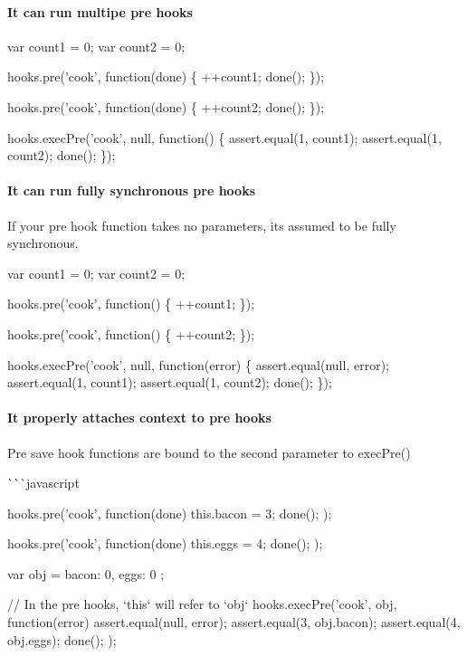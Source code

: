 \paragraph*{It can run multipe pre hooks}


\begin{DoxyCode}
var count1 = 0;
var count2 = 0;

hooks.pre('cook', function(done) \{
  ++count1;
  done();
\});

hooks.pre('cook', function(done) \{
  ++count2;
  done();
\});

hooks.execPre('cook', null, function() \{
  assert.equal(1, count1);
  assert.equal(1, count2);
  done();
\});
\end{DoxyCode}


\paragraph*{It can run fully synchronous pre hooks}

If your pre hook function takes no parameters, its assumed to be fully synchronous.


\begin{DoxyCode}
var count1 = 0;
var count2 = 0;

hooks.pre('cook', function() \{
  ++count1;
\});

hooks.pre('cook', function() \{
  ++count2;
\});

hooks.execPre('cook', null, function(error) \{
  assert.equal(null, error);
  assert.equal(1, count1);
  assert.equal(1, count2);
  done();
\});
\end{DoxyCode}


\paragraph*{It properly attaches context to pre hooks}

Pre save hook functions are bound to the second parameter to {\ttfamily exec\+Pre()}

\`{}\`{}\`{}javascript \begin{DoxyVerb}hooks.pre('cook', function(done) {
  this.bacon = 3;
  done();
});

hooks.pre('cook', function(done) {
  this.eggs = 4;
  done();
});

var obj = { bacon: 0, eggs: 0 };

// In the pre hooks, `this` will refer to `obj`
hooks.execPre('cook', obj, function(error) {
  assert.equal(null, error);
  assert.equal(3, obj.bacon);
  assert.equal(4, obj.eggs);
  done();
});
\end{DoxyVerb}



